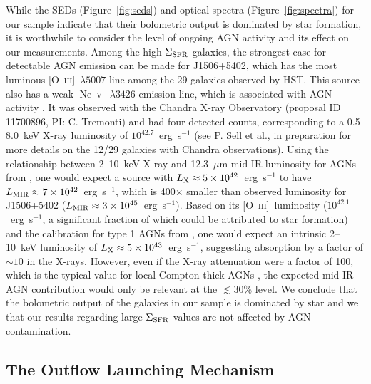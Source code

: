 \documentclass[apj]{emulateapj}
\newcommand{\nev}{[\textrm{Ne}~\textsc{v}]}
\newcommand{\oiii}{[\textrm{O}~\textsc{iii}]}
\newcommand{\sigmasfr}{\Sigma_{\textnormal{\scriptsize{SFR}}}}
\begin{document}
While the SEDs (Figure~\ref{fig:seds}) and optical spectra
(Figure~\ref{fig:spectra}) for our sample indicate that their
bolometric output is dominated by star formation, it is worthwhile to
consider the level of ongoing AGN activity and its effect on our
measurements.  Among the high-$\sigmasfr$ galaxies, the strongest case
for detectable AGN emission can be made for J1506+5402, which has the
most luminous \oiii~$\lambda5007$ line among the 29 galaxies observed
by HST.  This source also has a weak \nev~$\lambda3426$ emission line,
which is associated with AGN activity \citep[e.g.,][]{gil10}.  It was
observed with the Chandra X-ray Observatory (proposal ID 11700896, PI:
C. Tremonti) and had four detected counts, corresponding to a
0.5--8.0~keV X-ray luminosity of $10^{42.7}$~erg~s$^{-1}$ (see P. Sell
et al., in preparation for more details on the 12/29 galaxies with
Chandra observations).  Using the relationship between 2--10~keV X-ray
and 12.3~$\mu$m mid-IR luminosity for AGNs from \citet{gan09}, one
would expect a source with
$L_{\textnormal{\scriptsize{X}}}\approx5\times10^{42}$~erg~s$^{-1}$ to
have
$L_{\textnormal{\scriptsize{MIR}}}\approx7\times10^{42}$~erg~s$^{-1}$,
which is 400$\times$ smaller than observed luminosity for J1506+5402
($L_{\textnormal{\scriptsize{MIR}}}\approx3\times10^{45}$~erg~s$^{-1}$).
Based on its \oiii\ luminosity ($10^{42.1}$~erg~s$^{-1}$, a
significant fraction of which could be attributed to star formation)
and the calibration for type 1 AGNs from \citet{hec05}, one would
expect an intrinsic 2--10~keV luminosity of
$L_{\textnormal{\scriptsize{X}}}\approx5\times10^{43}$~erg~s$^{-1}$,
suggesting absorption by a factor of $\sim10$ in the X-rays.  However,
even if the X-ray attenuation were a factor of 100, which is the
typical value for local Compton-thick AGNs \citep{dia09}, the expected
mid-IR AGN contribution would only be relevant at the $\lesssim$30\%
level.  We conclude that the bolometric output of the galaxies in our
sample is dominated by star and we that our results regarding large
$\sigmasfr$ values are not affected by AGN contamination.



\subsection{The Outflow Launching Mechanism}\label{sec:launch}
\end{document}
